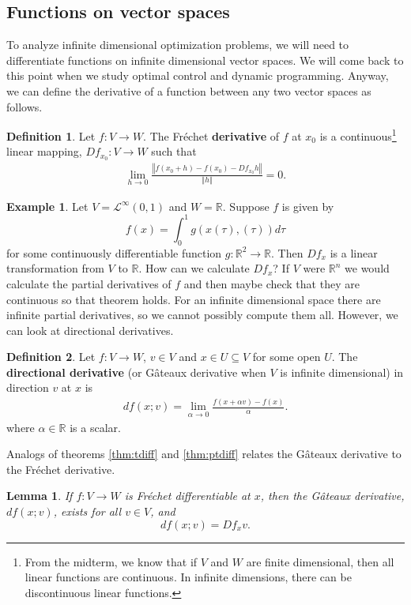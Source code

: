 \documentclass[12pt,reqno]{amsart}
\newtheorem{lemma}{Lemma}[section]
\theoremstyle{definition}
\newtheorem{definition}{Definition}[section]
\newtheorem{example}{Example}[section]
\def\R{\mathbb{R}}
\newcommand{\norm}[1]{\left\Vert {#1} \right\Vert}
\renewcommand{\to}{{\rightarrow}}
\begin{document}
\subsection{Functions on vector spaces}
To analyze infinite dimensional optimization problems, we will need to
differentiate functions on infinite dimensional vector spaces. We will
come back to this point when we study optimal control and dynamic
programming. Anyway, we can define the derivative of a function
between any two vector spaces as follows. 
\begin{definition}
  Let $f: V \to W$. The Fr\'{e}chet \textbf{derivative} of $f$ at
  $x_0$ is a continuous\footnote{From the midterm, we know that if $V$
    and $W$ are finite dimensional, then all linear functions are
    continuous. In infinite dimensions, there can be discontinuous
    linear functions.} linear mapping, $Df_{x_0}: V \to W$ such that
  \begin{align*}
    \lim_{h \to 0} \frac{\left\Vert f(x_0 + h) - f(x_0) - Df_{x_0}
        h\right\Vert} {\norm{h}} = 0. 
  \end{align*}
\end{definition}
\begin{example}\label{ex:fre}
  Let $V = \mathcal{L}^\infty(0,1)$ and $W = \R$. Suppose $f$ is given by
  \[ f(x) = \int_0^1 g(x(\tau),(\tau)) d\tau \] 
  for some continuously differentiable function $g:\R^2 \to
  \R$. 
  Then $Df_{x}$ is a linear transformation from $V$ to $\R$. How
  can we calculate $Df_x$? If $V$ were $\R^n$ we would calculate the
  partial derivatives of $f$ and then maybe check that they are
  continuous so that theorem \label{thm:ptdiff} holds. For an infinite
  dimensional space there are infinite partial derivatives, so we
  cannot possibly compute them all. However, we can look at
  directional derivatives. 
\end{example}
\begin{definition}
  Let $f: V \to W$, $v \in V$ and $x \in U \subseteq V$ for some open
  $U$. The \textbf{directional derivative} (or G\^{a}teaux derivative
  when $V$ is infinite dimensional)  in direction $v$ at $x$ is
  \begin{align*}
    df(x;v) = \lim_{\alpha \to 0} \frac{f(x + \alpha v) - f(x)}{\alpha}.
  \end{align*}  
  where $\alpha \in \R$ is a scalar.
\end{definition}
Analogs of theorems \ref{thm:tdiff} and \ref{thm:ptdiff} relates the
G\^{a}teaux derivative to the Fr\'{e}chet derivative.
\begin{lemma}\label{lem:fregat}
  If $f: V \to W$ is Fr\'{e}chet differentiable at $x$, then the
  G\^{a}teaux derivative, $df(x;v)$, exists for all $v \in V$, and
  \[ df(x;v) = Df_x v. \]
\end{lemma}
\end{document}
